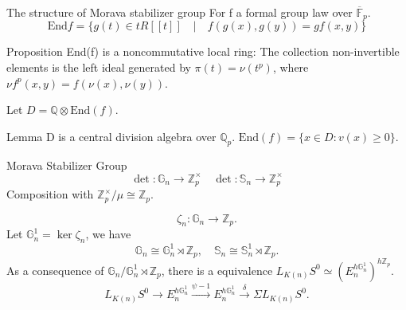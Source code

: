 \documentclass[aspectratio=1610]{ctexbeamer}
\def  \End      {\mathrm{End}}
\def  \bF       {\mathbb{F}}
\def  \bg       {\mathbb{G}}
\def  \bq       {\mathbb{Q}}
\def  \bs       {\mathbb{S}}
\def  \bz       {\mathbb{Z}}
\begin{document}
\begin{frame}{The structure of Morava stabilizer group}
	For f a formal group law over $\overline{\bF}_p$.  
	$$
	\mathrm{End}f = \{g(t) \in t R[\![t]\!] \quad | \quad f(g(x),g(y))= gf(x,y)  \}
	$$
	\begin{alertblock}{Proposition}
		End(f) is a noncommutative local ring: The collection non-invertible elements is the left ideal generated by $\pi (t) = \nu (t^p)$, where $ \nu f^p(x,y) = f (\nu(x), \nu(y))$.
	\end{alertblock}	
	Let $ D=  \bq  \otimes \End(f)$.
	\begin{alertblock}{Lemma}
		D is a central division algebra over $ \bq_p$. $\End(f)= \{x \in D: v(x) \geq 0\}$.
	\end{alertblock}
\end{frame}


\begin{frame}{Morava Stabilizer Group}
	$$
	\det: \mathbb{G}_n  \to \bz_p^{\times}  \quad \det: \bs_n \to \bz_p^{\times}
	$$
	Composition with $\bz^{\times}_p/\mu \cong \bz_p$.
	
	$$
	\zeta_n: \mathbb{G}_n \to \bz_p.
	$$
	Let $\mathbb{G}^1_n =  \ker \zeta_n$, we have
	$$
	\mathbb{G}_n \cong \mathbb{G}^1_n \rtimes \bz_p, \quad \mathbb{S}_n \cong \mathbb{S}^1_n \rtimes \bz_p.
	$$
	As a consequence of $\mathbb{G}_n /  \mathbb{G}^1_n \rtimes \bz_p$, there is a equivalence $L_{K(n)} S^0 \simeq (E_n^{h \bg^1_n})^{h \bz_p}$.
	$$
	L_{K(n)} S^0 \longrightarrow E_n^{h \mathbb{G}_n^1} \overset{\psi-1}{\longrightarrow} E_n^{h \mathbb{G}_n^1} \overset{\delta}{\rightarrow} \Sigma L_{K(n)} S^0.
	$$
\end{frame}
\end{document}
